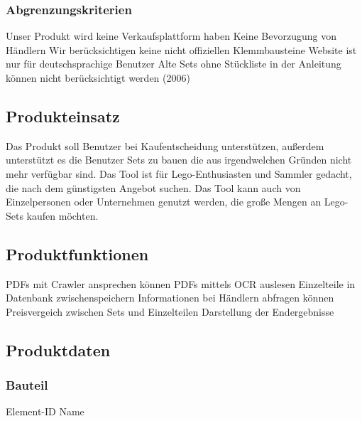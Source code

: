 \subsubsection{Abgrenzungskriterien}
Unser Produkt wird keine Verkaufsplattform haben  \newline
Keine Bevorzugung von Händlern \newline
Wir berücksichtigen keine nicht offiziellen Klemmbausteine \newline
Website ist nur für deutschsprachige Benutzer \newline
Alte Sets ohne Stückliste in der Anleitung können nicht berücksichtigt werden (2006) \newline

\subsection{Produkteinsatz}
 Das Produkt soll Benutzer bei Kaufentscheidung unterstützen, außerdem unterstützt es die Benutzer Sets zu bauen die aus irgendwelchen Gründen nicht mehr verfügbar sind.\newline
Das Tool ist für Lego-Enthusiasten und Sammler gedacht, die nach dem günstigsten Angebot suchen. Das Tool kann auch von Einzelpersonen oder Unternehmen genutzt werden, die große Mengen an Lego-Sets kaufen möchten. \newline

\subsection{Produktfunktionen}
PDFs mit Crawler ansprechen können \newline
PDFs mittels OCR auslesen \newline
Einzelteile in Datenbank zwischenspeichern \newline
Informationen bei Händlern abfragen können \newline
Preisvergeich zwischen Sets und Einzelteilen \newline
Darstellung der Endergebnisse \newline

\subsection{Produktdaten}

\subsubsection{Bauteil}
Element-ID\newline
Name \newline

